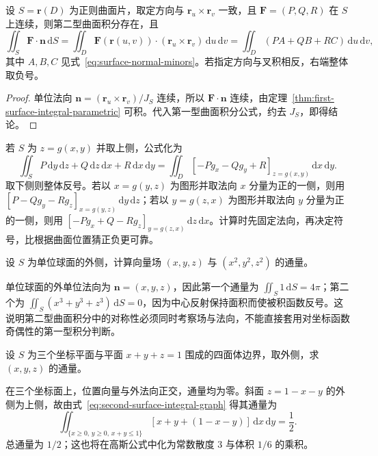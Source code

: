 \documentclass[UTF8,12pt,a4paper,fontset=fandol]{ctexbook}
\begin{document}
\begin{theorem}
\label{thm:second-surface-integral-parametric}
设 $S=\boldsymbol r(D)$ 为正则曲面片，取定方向与 $\boldsymbol r_u\times\boldsymbol r_v$ 一致，且 $\boldsymbol F=(P,Q,R)$ 在 $S$ 上连续，则第二型曲面积分存在，且
\begin{equation}
\label{eq:second-surface-integral-parametric}
    \iint_S\boldsymbol F\cdot\boldsymbol n\,\mathrm dS
    =\iint_D\boldsymbol F(\boldsymbol r(u,v))\cdot
      (\boldsymbol r_u\times\boldsymbol r_v)\,\mathrm du\,\mathrm dv
    =\iint_D(PA+QB+RC)\,\mathrm du\,\mathrm dv,
\end{equation}
其中 $A,B,C$ 见式~\eqref{eq:surface-normal-minors}。若指定方向与叉积相反，右端整体取负号。
\end{theorem}
\begin{proof}
单位法向 $\boldsymbol n=(\boldsymbol r_u\times\boldsymbol r_v)/J_S$ 连续，所以 $\boldsymbol F\cdot\boldsymbol n$ 连续，由定理~\ref{thm:first-surface-integral-parametric} 可积。代入第一型曲面积分公式，约去 $J_S$，即得结论。
\end{proof}

若 $S$ 为 $z=g(x,y)$ 并取上侧，公式化为
\begin{equation}
\label{eq:second-surface-integral-graph}
    \iint_S P\,\mathrm dy\,\mathrm dz+Q\,\mathrm dz\,\mathrm dx+R\,\mathrm dx\,\mathrm dy
    =\iint_D[-Pg_x-Qg_y+R]_{z=g(x,y)}\,\mathrm dx\,\mathrm dy.
\end{equation}
取下侧则整体反号。若以 $x=g(y,z)$ 为图形并取法向 $x$ 分量为正的一侧，则用 $[P-Qg_y-Rg_z]_{x=g(y,z)}\,\mathrm dy\,\mathrm dz$；若以 $y=g(z,x)$ 为图形并取法向 $y$ 分量为正的一侧，则用 $[-Pg_x+Q-Rg_z]_{y=g(z,x)}\,\mathrm dz\,\mathrm dx$。计算时先固定法向，再决定符号，比根据曲面位置猜正负更可靠。

\begin{example}
\label{ex:second-surface-integral-unit-sphere}
设 $S$ 为单位球面的外侧，计算向量场 $(x,y,z)$ 与 $(x^2,y^2,z^2)$ 的通量。
\end{example}
\begin{solve}
单位球面的外单位法向为 $\boldsymbol n=(x,y,z)$，因此第一个通量为 $\iint_S1\,\mathrm dS=4\pi$；第二个为 $\iint_S(x^3+y^3+z^3)\,\mathrm dS=0$，因为中心反射保持面积而使被积函数反号。这说明第二型曲面积分中的对称性必须同时考察场与法向，不能直接套用对坐标函数奇偶性的第一型积分判断。
\end{solve}

\begin{example}
\label{ex:second-surface-integral-tetrahedron}
设 $S$ 为三个坐标平面与平面 $x+y+z=1$ 围成的四面体边界，取外侧，求 $(x,y,z)$ 的通量。
\end{example}
\begin{solve}
在三个坐标面上，位置向量与外法向正交，通量均为零。斜面 $z=1-x-y$ 的外侧为上侧，故由式~\eqref{eq:second-surface-integral-graph} 得其通量为
\[
    \iint_{\{x\geq0,\,y\geq0,\,x+y\leq1\}}
    [x+y+(1-x-y)]\,\mathrm dx\,\mathrm dy=\frac12.
\]
总通量为 $1/2$；这也将在高斯公式中化为常数散度 $3$ 与体积 $1/6$ 的乘积。
\end{solve}
\end{document}

